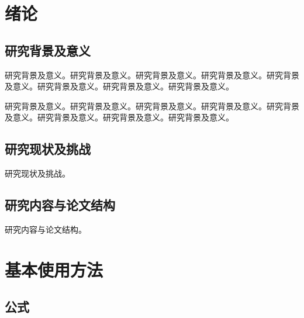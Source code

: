 \documentclass[openany,oneside]{book}
\begin{document}
\frontmatter
\sloppy %



\makecover

\tableofcontents
{\xiaosi}
\clearpage{\pagestyle{empty}\cleardoublepage}





\mainmatter
{}                        %

\chapter{绪论}
\section{研究背景及意义}

研究背景及意义。研究背景及意义。研究背景及意义。研究背景及意义。研究背景及意义。研究背景及意义。研究背景及意义。研究背景及意义。\par
研究背景及意义。研究背景及意义。研究背景及意义。研究背景及意义。研究背景及意义。研究背景及意义。研究背景及意义。研究背景及意义。

\section{研究现状及挑战}

研究现状及挑战。

\section{研究内容与论文结构}

研究内容与论文结构。


\chapter{基本使用方法}

\section{公式}
\end{document}
